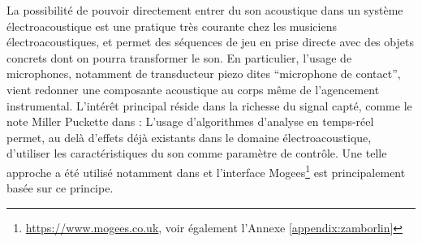 \noindent La possibilité de pouvoir directement entrer du son acoustique dans un système électroacoustique est une pratique très courante chez les musiciens électroacoustiques, et permet des séquences de jeu en prise directe avec des objets concrets dont on pourra transformer le son. En particulier, l'usage de microphones, notamment de transducteur piezo dites ``microphone de contact'', vient redonner une composante acoustique au corps même de l'agencement instrumental. L'intérêt principal réside dans la richesse du signal capté, comme le note Miller Puckette dans \cite{puckette_infuriating_2011}:  L'usage d'algorithmes d'analyse en temps-réel permet, au delà d'effets déjà existants dans le domaine électroacoustique, d'utiliser les caractéristiques du son comme paramètre de contrôle. Une telle approche a été utilisé notamment dans \cite{schwarz_rich_2014} et l'interface Mogees\footnote{\url{https://www.mogees.co.uk}, voir également l'Annexe \ref{appendix:zamborlin}} est principalement basée sur ce principe. 



